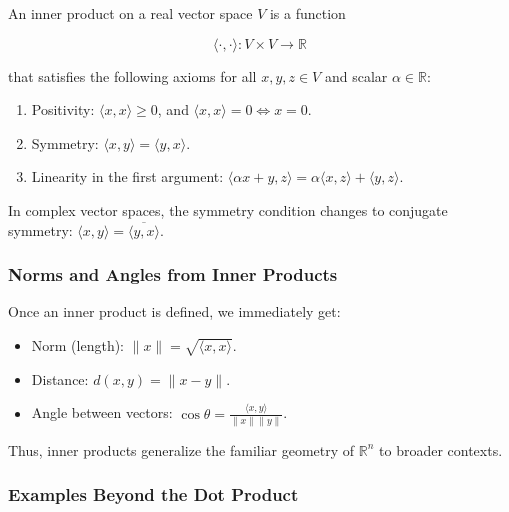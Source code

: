 \documentclass[
  letterpaper,
  DIV=11,
  numbers=noendperiod]{scrreprt}
\providecommand{\tightlist}{%
  \setlength{\itemsep}{0pt}\setlength{\parskip}{0pt}}
\begin{document}
An inner product on a real vector space \(V\) is a function

\[
\langle \cdot, \cdot \rangle : V \times V \to \mathbb{R}
\]

that satisfies the following axioms for all \(x,y,z \in V\) and scalar
\(\alpha \in \mathbb{R}\):

\begin{enumerate}
\def\labelenumi{\arabic{enumi}.}
\tightlist
\item
  Positivity: \(\langle x, x \rangle \geq 0\), and
  \(\langle x, x \rangle = 0 \iff x=0\).
\item
  Symmetry: \(\langle x, y \rangle = \langle y, x \rangle\).
\item
  Linearity in the first argument:
  \(\langle \alpha x + y, z \rangle = \alpha \langle x, z \rangle + \langle y, z \rangle\).
\end{enumerate}

In complex vector spaces, the symmetry condition changes to conjugate
symmetry: \(\langle x, y \rangle = \overline{\langle y, x \rangle}\).

\subsubsection{Norms and Angles from Inner
Products}\label{norms-and-angles-from-inner-products}

Once an inner product is defined, we immediately get:

\begin{itemize}
\item
  Norm (length): \(\|x\| = \sqrt{\langle x, x \rangle}\).
\item
  Distance: \(d(x,y) = \|x-y\|\).
\item
  Angle between vectors:
  \(\cos \theta = \frac{\langle x, y \rangle}{\|x\|\|y\|}\).
\end{itemize}

Thus, inner products generalize the familiar geometry of
\(\mathbb{R}^n\) to broader contexts.

\subsubsection{Examples Beyond the Dot
Product}\label{examples-beyond-the-dot-product}
\end{document}
